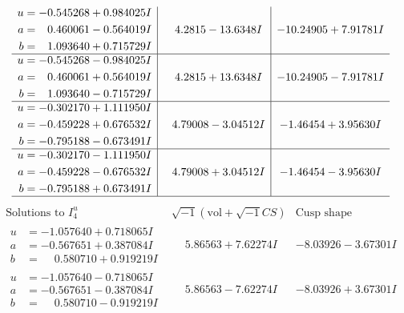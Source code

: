 \documentclass[1p]{elsarticle_modified}
\theoremstyle{definition}
\newcommand{\I}{\sqrt{-1}}
\begin{document}
$$\begin{array}{c|c|c}
\begin{aligned}
u &= -0.545268 + 0.984025 I \\
a &= \phantom{-}0.460061 - 0.564019 I \\
b &= \phantom{-}1.093640 + 0.715729 I\end{aligned}
 & \phantom{-}4.2815 - 13.6348 I & -10.24905 + 7.91781 I \\ \hline\begin{aligned}
u &= -0.545268 - 0.984025 I \\
a &= \phantom{-}0.460061 + 0.564019 I \\
b &= \phantom{-}1.093640 - 0.715729 I\end{aligned}
 & \phantom{-}4.2815 + 13.6348 I & -10.24905 - 7.91781 I \\ \hline\begin{aligned}
u &= -0.302170 + 1.111950 I \\
a &= -0.459228 + 0.676532 I \\
b &= -0.795188 - 0.673491 I\end{aligned}
 & \phantom{-}4.79008 - 3.04512 I & -1.46454 + 3.95630 I \\ \hline\begin{aligned}
u &= -0.302170 - 1.111950 I \\
a &= -0.459228 - 0.676532 I \\
b &= -0.795188 + 0.673491 I\end{aligned}
 & \phantom{-}4.79008 + 3.04512 I & -1.46454 - 3.95630 I\\
 \hline 
 \end{array}$$\newpage$$\begin{array}{c|c|c}  
\text{Solutions to }I^u_{4}& \I (\text{vol} + \sqrt{-1}CS) & \text{Cusp shape}\\
 \hline 
\begin{aligned}
u &= -1.057640 + 0.718065 I \\
a &= -0.567651 + 0.387084 I \\
b &= \phantom{-}0.580710 + 0.919219 I\end{aligned}
 & \phantom{-}5.86563 + 7.62274 I & -8.03926 - 3.67301 I \\ \hline\begin{aligned}
u &= -1.057640 - 0.718065 I \\
a &= -0.567651 - 0.387084 I \\
b &= \phantom{-}0.580710 - 0.919219 I\end{aligned}
 & \phantom{-}5.86563 - 7.62274 I & -8.03926 + 3.67301 I \\ \hline\begin{aligned}

\end{aligned}
\end{array}$$
\end{document}
